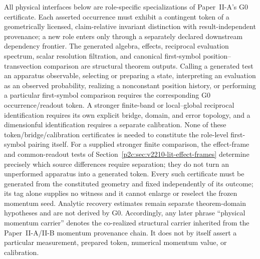 \documentclass[12pt,a4paper]{article}
\begin{document}
\begin{remark}
\label{p2c:rem:g0-occurrence-readout-boundary}
All physical interfaces below are role-specific specializations of
Paper~II-A's G0 certificate.  Each asserted occurrence must exhibit a
contingent token of a geometrically licensed, claim-relative invariant
distinction with result-independent provenance; a new role enters only through
a separately declared downstream dependency frontier.  The generated algebra, effects, reciprocal evaluation spectrum, scalar
resolution filtration, and canonical first-symbol position--transvection
comparison are structural theorem outputs.  Calling a generated test an
apparatus observable, selecting or preparing a state, interpreting an
evaluation as an observed probability, realizing a nonconstant position
history, or performing a particular first-symbol comparison requires the
corresponding G0 occurrence/readout token.  A stronger finite-band or
local--global reciprocal identification requires its own explicit bridge,
domain, and error topology, and a dimensionful identification requires a
separate calibration.  None of these token/bridge/calibration certificates is
needed to constitute the role-level first-symbol pairing itself. For a supplied stronger finite comparison, the effect-frame and common-readout tests of Section~\ref{p2c:sec:v2210-lit-effect-frames} determine precisely which source differences require separation; they do not turn an unperformed apparatus into a generated token.  Every such
certificate must be generated from the constituted geometry and fixed
independently of its outcome; its tag alone supplies no witness and it cannot
enlarge or reselect the frozen momentum seed.  Analytic
recovery estimates remain separate theorem-domain hypotheses and are not
derived by G0.
Accordingly, any later phrase ``physical momentum carrier'' denotes the
co-realized structural carrier inherited from the Paper~II-A/II-B momentum
provenance chain.  It does not by itself assert a particular measurement,
prepared token, numerical momentum value, or calibration.
\end{remark}
\end{document}
